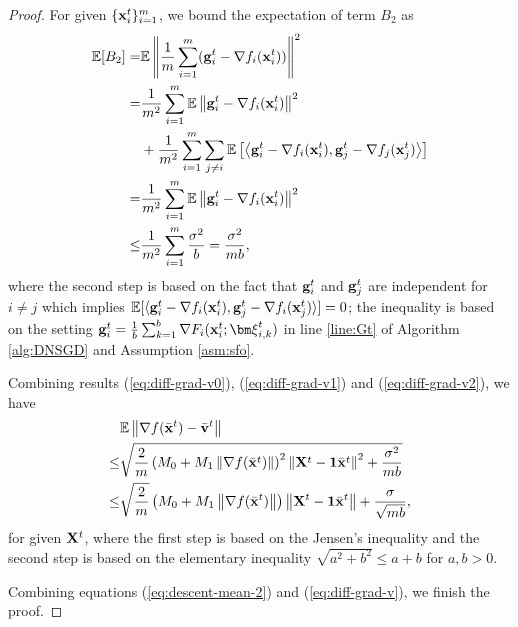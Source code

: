 \documentclass[sigconf]{acmart}
\newcommand{\Norm}[1]{\left\| #1 \right\|}
\def\vone{{\bf{1}}}
\def\vg{{\bf{g}}}
\def\vv{{\bf{v}}}
\def\vx{{\bf{x}}}
\def\BE{{\mathbb{E}}}
\def\mX {{\bf X}}
\theoremstyle{plain}
\def\bx{{\bar\vx}}
\def\bv{{\bar\vv}}
\def\vxi{{\bm\xi}}
\begin{document}
\begin{proof}
For given $\{\vx_i^t\}_{i=1}^m$, we bound the expectation of term $B_2$ as
\begin{align}\label{eq:diff-grad-v2}
\begin{split}    
\BE[B_2] = & \BE\Norm{\frac{1}{m}\sum_{i=1}^m (\vg_i^t - \nabla f_i(\vx_i^t))}^2  \\
= & \frac{1}{m^2}\sum_{i=1}^m {\mathbb E}\left\|\vg_i^t - \nabla f_i(\vx_i^t)\right\|^2  \\
& + \frac{1}{m^2}\sum_{i=1}^m\sum_{j\neq i} {\mathbb E}\left[\left\langle \vg_i^t - \nabla f_i(\vx_i^t), \vg_j^t - \nabla f_j(\vx_j^t)\right\rangle\right] \\
= & \frac{1}{m^2}\sum_{i=1}^m \BE\Norm{\vg_i^t - \nabla f_i(\vx_i^t)}^2  \\
\leq & \frac{1}{m^2}\sum_{i=1}^m \frac{\sigma^2}{b}  = \frac{\sigma^2}{mb},
\end{split}
\end{align}
where the second step is based on the fact that $\vg_i^t$ and $\vg_j^t$ are independent for $i\neq j$ which implies ${\mathbb E}[\langle \vg_i^t - \nabla f_i(\vx_i^t), \vg_j^t - \nabla f_i(\vx_j^t)\rangle]=0$;
the inequality is based on the setting $\vg_i^t=\frac{1}{b}\sum_{k=1}^b \nabla F_i(\vx_i^{{t}};\vxi_{i,k}^{{t}})$ in line \ref{line:Gt} of Algorithm \ref{alg:DNSGD} and Assumption \ref{asm:sfo}.

Combining results (\ref{eq:diff-grad-v0}), (\ref{eq:diff-grad-v1}) and (\ref{eq:diff-grad-v2}), we have
\begin{align}\label{eq:diff-grad-v}
\begin{split}    
  & \BE\Norm{\nabla f(\bx^t)-\bv^t} \\
\leq & \sqrt{\frac{2}{m}\left(M_0 + M_1\Norm{\nabla f(\bx^t)}\right)^2\Norm{\mX^t-\vone\bx^t}^2 + \frac{\sigma^2}{mb}} \\
\leq & \sqrt{\frac{2}{m}}\left(M_0 + M_1\Norm{\nabla f(\bx^t)}\right)\Norm{\mX^t-\vone\bx^t} + \frac{\sigma}{\sqrt{mb}},
\end{split}
\end{align}
for given $\mX^t$, where the first step is based on the Jensen's inequality 
and the second step is based on the elementary inequality $\sqrt{a^2+b^2}\leq a+b$ for $a,b>0$.

Combining equations (\ref{eq:descent-mean-2}) and (\ref{eq:diff-grad-v}), we finish the proof.
\end{proof}
\end{document}
